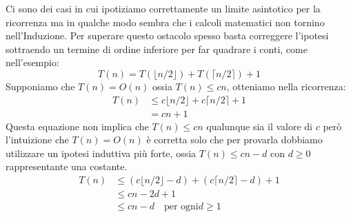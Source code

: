 
Ci sono dei casi in cui ipotiziamo correttamente un limite asintotico per la ricorrenza
ma in qualche modo sembra che i calcoli matematici non tornino nell'Induzione.
Per superare questo ostacolo spesso basta correggere l'ipotesi sottraendo un termine
di ordine inferiore per far quadrare i conti, come nell'esempio:
\begin{equation*}
    T(n) = T(\lfloor n/2 \rfloor) + T(\lceil n/2 \rceil) + 1
\end{equation*}
Supponiamo che $T(n) = O(n)$ ossia $T(n) \leq cn$, otteniamo nella ricorrenza:
\begin{equation*}
\begin{split}
    T(n) & \leq c \lfloor n/2 \rfloor + c \lceil n/2 \rceil + 1 \\
         & = cn + 1
\end{split}
\end{equation*}
Questa equazione non implica che $T(n) \leq cn$ qualunque sia il valore di $c$ però
l'intuizione che $T(n) = O(n)$ è corretta solo che per provarla dobbiamo utilizzare
un ipotesi induttiva più forte, ossia $T(n) \leq cn - d$ con $d \geq 0$ rappresentante una costante.
\begin{equation*}
\begin{split}
    T(n) & \leq (c \lfloor n/2 \rfloor - d) + (c \lceil n/2 \rceil -d) + 1 \\
         & \leq cn - 2d + 1 \\
         & \leq cn - d \quad \text{per ogni} d \geq 1 \\
\end{split}
\end{equation*}
